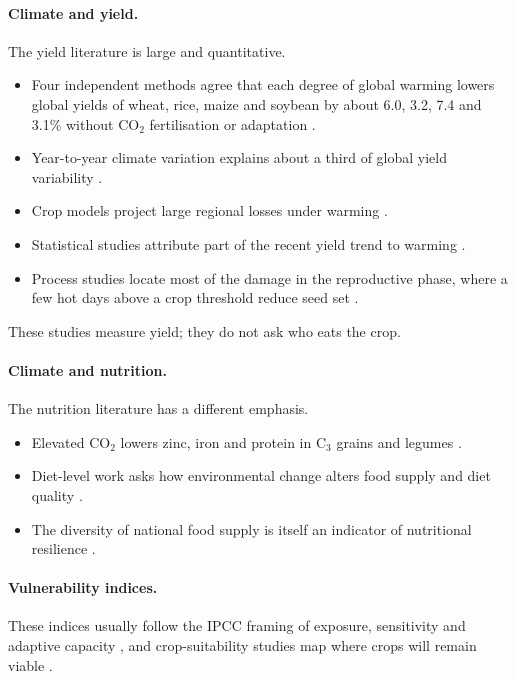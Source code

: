 \paragraph{Climate and yield.} The yield literature is large and quantitative.
\begin{itemize}
\item Four independent methods agree that each degree of global warming lowers global yields of wheat, rice,
maize and soybean by about 6.0, 3.2, 7.4 and 3.1\% without CO$_2$ fertilisation or adaptation \citep{zhao2017}.
\item Year-to-year climate variation explains about a third of global yield variability \citep{ray2015}.
\item Crop models project large regional losses under warming \citep{rosenzweig2014,jagermeyr2021}.
\item Statistical studies attribute part of the recent yield trend to warming \citep{lobell2007,lobell2011}.
\item Process studies locate most of the damage in the reproductive phase, where a few hot days above a crop
threshold reduce seed set \citep{jagadish2007,deryng2014,boote2005}.
\end{itemize}
These studies measure yield; they do not ask who eats the crop.

\paragraph{Climate and nutrition.} The nutrition literature has a different emphasis.
\begin{itemize}
\item Elevated CO$_2$ lowers zinc, iron and protein in C$_3$ grains and legumes \citep{myers2014,smith2018,zhu2018,beach2019}.
\item Diet-level work asks how environmental change alters food supply and diet quality
\citep{scheelbeek2018,nelson2018,medek2017}.
\item The diversity of national food supply is itself an indicator of nutritional resilience \citep{remans2014}.
\end{itemize}

\paragraph{Vulnerability indices.} These indices usually follow the IPCC framing of exposure, sensitivity and
adaptive capacity \citep{ipcc2022ch5}, and crop-suitability studies map where crops will remain viable
\citep{ramirez2017,rippke2016}.

